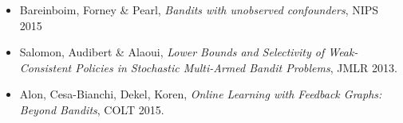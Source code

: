 \documentclass[wcp]{jmlr}
\begin{document}
\begin{itemize}
	\item Bareinboim, Forney \& Pearl, \emph{Bandits with unobserved 
			confounders}, NIPS 2015
	\item Salomon, Audibert \& Alaoui, \emph{Lower Bounds and Selectivity of 
			Weak-Consistent Policies in Stochastic Multi-Armed Bandit Problems},
			JMLR 2013.
	\item Alon, Cesa-Bianchi, Dekel, Koren, \emph{Online Learning with Feedback
			Graphs: Beyond Bandits}, COLT 2015.
\end{itemize}




\end{document}
